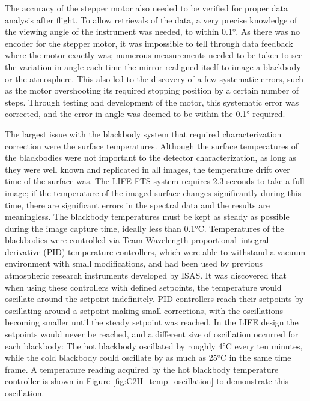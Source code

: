 The accuracy of the stepper motor also needed to be verified for proper data analysis after flight. To allow retrievals of the data, a very precise knowledge of the viewing angle of the instrument was needed, to within 0.1°. As there was no encoder for the stepper motor, it was impossible to tell through data feedback where the motor exactly was; numerous measurements needed to be taken to see the variation in angle each time the mirror realigned itself to image a blackbody or the atmosphere. This also led to the discovery of a few systematic errors, such as the motor overshooting its required stopping position by a certain number of steps. Through testing and development of the motor, this systematic error was corrected, and the error in angle was deemed to be within the 0.1° required.

The largest issue with the blackbody system that required characterization correction were the surface temperatures. Although the surface temperatures of the blackbodies were not important to the detector characterization, as long as they were well known and replicated in all images, the temperature drift over time of the surface was. The LIFE FTS system requires 2.3 seconds to take a full image; if the temperature of the imaged surface changes significantly during this time, there are significant errors in the spectral data and the results are meaningless. The blackbody temperatures must be kept as steady as possible during the image capture time, ideally less than 0.1°C. Temperatures of the blackbodies were controlled via Team Wavelength proportional–integral–derivative (PID) temperature controllers, which were able to withstand a vacuum environment with small modifications, and had been used by previous atmospheric research instruments developed by ISAS. It was discovered that when using these controllers with defined setpoints, the temperature would oscillate around the setpoint indefinitely. PID controllers reach their setpoints by oscillating around a setpoint making small corrections, with the oscillations becoming smaller until the steady setpoint was reached. In the LIFE design the setpoints would never be reached, and a different size of oscillation occurred for each blackbody: The hot blackbody oscillated by roughly 4°C every ten minutes, while the cold blackbody could oscillate by as much as 25°C in the same time frame. A temperature reading acquired by the hot blackbody temperature controller is shown in Figure \ref{fig:C2H_temp_oscillation} to demonstrate this oscillation.

